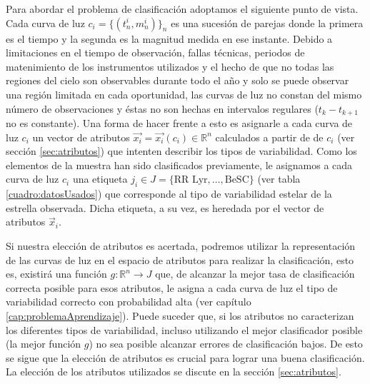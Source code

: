 \documentclass[letterpaper,12pt]{book}
\begin{document}
Para abordar el problema de clasificación adoptamos el siguiente punto de vista. Cada curva de luz $c_i = \{(t_{n}^{i}, m_{n}^{i})\}_{n}$ es una sucesión de parejas donde la primera es el tiempo y la segunda es la magnitud medida en ese instante.  Debido a limitaciones en el tiempo de observación, fallas técnicas, periodos de matenimiento de los instrumentos utilizados y el hecho de que no todas las regiones del cielo son observables durante todo el año y solo se puede observar una región limitada en cada oportunidad, las curvas de luz no constan del mismo número de observaciones y éstas no son hechas en intervalos regulares ($t_{k} - t_{k+1}$ no es constante). Una forma de hacer frente a esto es asignarle a cada curva de luz $c_i$ un vector de atributos $\vec{x_{i}} = \vec{x_{i}}(c_i)\in\mathbb{R}^{n}$ calculados a partir de de $c_i$ (ver sección \ref{sec:atributos}) que intenten describir los tipos de variabilidad. Como los elementos de la muestra han sido clasificados previamente, le asignamos a cada curva de luz $c_i$ una etiqueta $j_i\in J=\{\text{RR Lyr}, \dots, \text{BeSC}\}$ (ver tabla \ref{cuadro:datosUsados}) que corresponde al tipo de variabilidad estelar de la estrella observada.  Dicha etiqueta, a su vez, es heredada por el vector de atributos $\vec{x}_i$.

Si nuestra elección de atributos es acertada, podremos utilizar la representación de las curvas de luz en el espacio de atributos para realizar la clasificación, esto es, existirá una función $g:\mathbb{R}^n\rightarrow J$ que, de alcanzar la mejor tasa de clasificación correcta posible para esos atributos, le asigna a cada curva de luz el tipo de variabilidad correcto con probabilidad alta (ver capítulo \ref{cap:problemaAprendizaje}). Puede suceder que, si los atributos no caracterizan los diferentes tipos de variabilidad, incluso utilizando el mejor clasificador posible (la mejor función $g$) no sea posible alcanzar errores de clasificación bajos. De esto se sigue que la elección de atributos es crucial para lograr una buena clasificación. La elección de los atributos utilizados se discute en la sección \ref{sec:atributos}.
\end{document}

